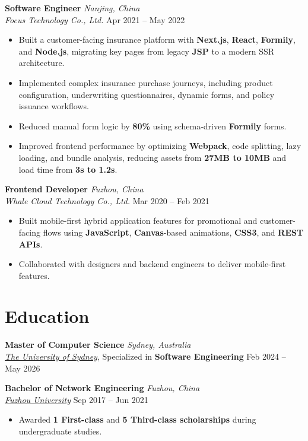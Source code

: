 \documentclass[a4paper,11pt]{article}
\newcommand{\resumeItem}[1]{\item #1}
\newcommand{\role}[4]{%
  \textbf{#1} \hfill \textit{#2}\\
  \textit{#3} \hfill #4\vspace{-2pt}
}
\newcommand{\education}[4]{%
  \textbf{#1} \hfill \textit{#2}\\
  \textit{\underline{#3}} \hfill #4\vspace{2pt}
}
\begin{document}
\role{Software Engineer}{Nanjing, China}{Focus Technology Co., Ltd.}{Apr 2021 -- May 2022}
\begin{itemize}
  \resumeItem{Built a customer-facing insurance platform with \textbf{Next.js}, \textbf{React}, \textbf{Formily}, and \textbf{Node.js}, migrating key pages from legacy \textbf{JSP} to a modern SSR architecture.}
  \resumeItem{Implemented complex insurance purchase journeys, including product configuration, underwriting questionnaires, dynamic forms, and policy issuance workflows.}
\resumeItem{Reduced manual form logic by \textbf{80\%} using schema-driven \textbf{Formily} forms.}
  \resumeItem{Improved frontend performance by optimizing \textbf{Webpack}, code splitting, lazy loading, and bundle analysis, reducing assets from \textbf{27MB to 10MB} and load time from \textbf{3s to 1.2s}.}
\end{itemize}

\role{Frontend Developer}{Fuzhou, China}{Whale Cloud Technology Co., Ltd.}{Mar 2020 -- Feb 2021}
\begin{itemize}
  \resumeItem{Built mobile-first hybrid application features for promotional and customer-facing flows using \textbf{JavaScript}, \textbf{Canvas}-based animations, \textbf{CSS3}, and \textbf{REST APIs}.}
\resumeItem{Collaborated with designers and backend engineers to deliver mobile-first features.}
\end{itemize}
\section{Education}

\textbf{Master of Computer Science} \hfill \textit{Sydney, Australia}\\
\textit{\underline{The University of Sydney}}, Specialized in \textbf{Software Engineering} \hfill Feb 2024 -- May 2026\vspace{2pt}

\education{Bachelor of Network Engineering}{Fuzhou, China}{Fuzhou University}{Sep 2017 -- Jun 2021}
\begin{itemize}
  \resumeItem{Awarded \textbf{1 First-class} and \textbf{5 Third-class scholarships} during undergraduate studies.}
\end{itemize}
\end{document}

